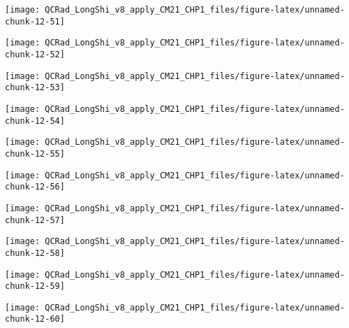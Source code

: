 \documentclass[
  10pt,
  a4paper,oneside]{article}
\begin{document}
\begin{center}\texttt{[image: QCRad\_LongShi\_v8\_apply\_CM21\_CHP1\_files/figure-latex/unnamed-chunk-12-51]} \end{center}

\begin{center}\texttt{[image: QCRad\_LongShi\_v8\_apply\_CM21\_CHP1\_files/figure-latex/unnamed-chunk-12-52]} \end{center}

\begin{center}\texttt{[image: QCRad\_LongShi\_v8\_apply\_CM21\_CHP1\_files/figure-latex/unnamed-chunk-12-53]} \end{center}

\begin{center}\texttt{[image: QCRad\_LongShi\_v8\_apply\_CM21\_CHP1\_files/figure-latex/unnamed-chunk-12-54]} \end{center}

\begin{center}\texttt{[image: QCRad\_LongShi\_v8\_apply\_CM21\_CHP1\_files/figure-latex/unnamed-chunk-12-55]} \end{center}

\begin{center}\texttt{[image: QCRad\_LongShi\_v8\_apply\_CM21\_CHP1\_files/figure-latex/unnamed-chunk-12-56]} \end{center}

\begin{center}\texttt{[image: QCRad\_LongShi\_v8\_apply\_CM21\_CHP1\_files/figure-latex/unnamed-chunk-12-57]} \end{center}

\begin{center}\texttt{[image: QCRad\_LongShi\_v8\_apply\_CM21\_CHP1\_files/figure-latex/unnamed-chunk-12-58]} \end{center}

\begin{center}\texttt{[image: QCRad\_LongShi\_v8\_apply\_CM21\_CHP1\_files/figure-latex/unnamed-chunk-12-59]} \end{center}

\begin{center}\texttt{[image: QCRad\_LongShi\_v8\_apply\_CM21\_CHP1\_files/figure-latex/unnamed-chunk-12-60]} \end{center}
\end{document}
